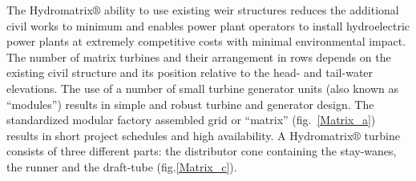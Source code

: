 The Hydromatrix$\circledR$ ability to use existing weir structures reduces the  additional civil works to minimum and enables power plant operators to install hydroelectric power plants at extremely competitive costs with minimal environmental impact. The number of matrix turbines and their arrangement in rows depends on the existing civil structure and its position relative to the head- and tail-water elevations. The use of a number of small turbine generator units (also known as “modules”) results in simple and robust turbine and generator design. The standardized modular factory assembled grid or “matrix” (fig.~\ref{Matrix_a}) results in short project schedules and high availability. A Hydromatrix$\circledR$ turbine consists of three different parts: the distributor cone containing the stay-wanes, the runner and the draft-tube (fig.\ref{Matrix_c}).



